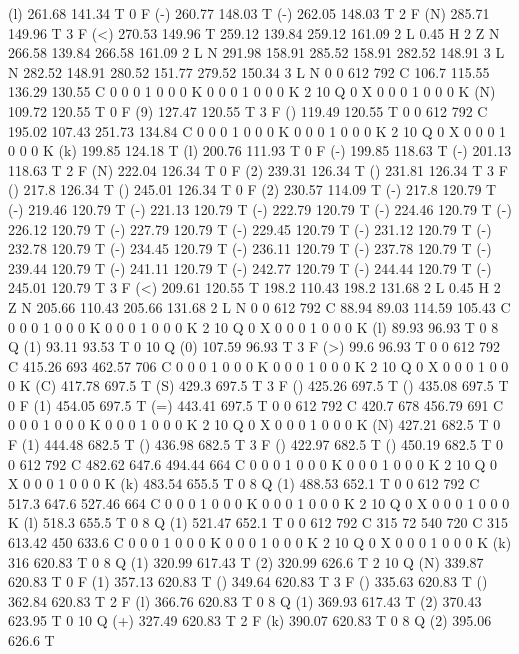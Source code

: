 (l) 261.68 141.34 T
0 F
(-) 260.77 148.03 T
(-) 262.05 148.03 T
2 F
(N) 285.71 149.96 T
3 F
(<) 270.53 149.96 T
259.12 139.84 259.12 161.09 2 L
0.45 H
2 Z
N
266.58 139.84 266.58 161.09 2 L
N
291.98 158.91 285.52 158.91 282.52 148.91 3 L
N
282.52 148.91 280.52 151.77 279.52 150.34 3 L
N
0 0 612 792 C
106.7 115.55 136.29 130.55 C
0 0 0 1 0 0 0 K
0 0 0 1 0 0 0 K
2 10 Q
0 X
0 0 0 1 0 0 0 K
(N) 109.72 120.55 T
0 F
(9) 127.47 120.55 T
3 F
() 119.49 120.55 T
0 0 612 792 C
195.02 107.43 251.73 134.84 C
0 0 0 1 0 0 0 K
0 0 0 1 0 0 0 K
2 10 Q
0 X
0 0 0 1 0 0 0 K
(k) 199.85 124.18 T
(l) 200.76 111.93 T
0 F
(-) 199.85 118.63 T
(-) 201.13 118.63 T
2 F
(N) 222.04 126.34 T
0 F
(2) 239.31 126.34 T
() 231.81 126.34 T
3 F
() 217.8 126.34 T
() 245.01 126.34 T
0 F
(2) 230.57 114.09 T
(-) 217.8 120.79 T
(-) 219.46 120.79 T
(-) 221.13 120.79 T
(-) 222.79 120.79 T
(-) 224.46 120.79 T
(-) 226.12 120.79 T
(-) 227.79 120.79 T
(-) 229.45 120.79 T
(-) 231.12 120.79 T
(-) 232.78 120.79 T
(-) 234.45 120.79 T
(-) 236.11 120.79 T
(-) 237.78 120.79 T
(-) 239.44 120.79 T
(-) 241.11 120.79 T
(-) 242.77 120.79 T
(-) 244.44 120.79 T
(-) 245.01 120.79 T
3 F
(<) 209.61 120.55 T
198.2 110.43 198.2 131.68 2 L
0.45 H
2 Z
N
205.66 110.43 205.66 131.68 2 L
N
0 0 612 792 C
88.94 89.03 114.59 105.43 C
0 0 0 1 0 0 0 K
0 0 0 1 0 0 0 K
2 10 Q
0 X
0 0 0 1 0 0 0 K
(l) 89.93 96.93 T
0 8 Q
(1) 93.11 93.53 T
0 10 Q
(0) 107.59 96.93 T
3 F
(>) 99.6 96.93 T
0 0 612 792 C
415.26 693 462.57 706 C
0 0 0 1 0 0 0 K
0 0 0 1 0 0 0 K
2 10 Q
0 X
0 0 0 1 0 0 0 K
(C) 417.78 697.5 T
(S) 429.3 697.5 T
3 F
() 425.26 697.5 T
() 435.08 697.5 T
0 F
(1) 454.05 697.5 T
(=) 443.41 697.5 T
0 0 612 792 C
420.7 678 456.79 691 C
0 0 0 1 0 0 0 K
0 0 0 1 0 0 0 K
2 10 Q
0 X
0 0 0 1 0 0 0 K
(N) 427.21 682.5 T
0 F
(1) 444.48 682.5 T
() 436.98 682.5 T
3 F
() 422.97 682.5 T
() 450.19 682.5 T
0 0 612 792 C
482.62 647.6 494.44 664 C
0 0 0 1 0 0 0 K
0 0 0 1 0 0 0 K
2 10 Q
0 X
0 0 0 1 0 0 0 K
(k) 483.54 655.5 T
0 8 Q
(1) 488.53 652.1 T
0 0 612 792 C
517.3 647.6 527.46 664 C
0 0 0 1 0 0 0 K
0 0 0 1 0 0 0 K
2 10 Q
0 X
0 0 0 1 0 0 0 K
(l) 518.3 655.5 T
0 8 Q
(1) 521.47 652.1 T
0 0 612 792 C
315 72 540 720 C
315 613.42 450 633.6 C
0 0 0 1 0 0 0 K
0 0 0 1 0 0 0 K
2 10 Q
0 X
0 0 0 1 0 0 0 K
(k) 316 620.83 T
0 8 Q
(1) 320.99 617.43 T
(2) 320.99 626.6 T
2 10 Q
(N) 339.87 620.83 T
0 F
(1) 357.13 620.83 T
() 349.64 620.83 T
3 F
() 335.63 620.83 T
() 362.84 620.83 T
2 F
(l) 366.76 620.83 T
0 8 Q
(1) 369.93 617.43 T
(2) 370.43 623.95 T
0 10 Q
(+) 327.49 620.83 T
2 F
(k) 390.07 620.83 T
0 8 Q
(2) 395.06 626.6 T
